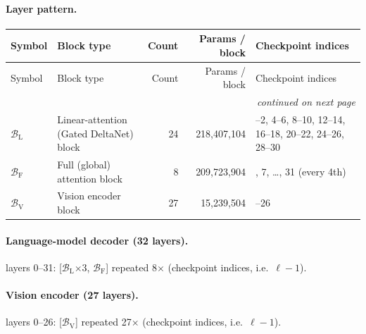 \documentclass[10pt,a4paper]{article}
\theoremstyle{definition}
\begin{document}
\paragraph{Layer pattern.}
\begin{longtable}{l>{\raggedright\arraybackslash}p{5.6cm}rr>{\raggedright\arraybackslash}p{4.4cm}}
\toprule
Symbol & Block type & Count & Params / block & Checkpoint indices \\
\midrule
\endfirsthead
\toprule
Symbol & Block type & Count & Params / block & Checkpoint indices \\
\midrule
\endhead
\midrule \multicolumn{5}{r}{\textit{continued on next page}} \\
\endfoot
\bottomrule
\endlastfoot
$\mathcal{B}_{\mathrm{L}}$ & Linear-attention (Gated DeltaNet) block & 24 & 218,407,104 & 0--2, 4--6, 8--10, 12--14, 16--18, 20--22, 24--26, 28--30 \\
$\mathcal{B}_{\mathrm{F}}$ & Full (global) attention block & 8 & 209,723,904 & 3, 7, \ldots, 31 (every 4th) \\
$\mathcal{B}_{\mathrm{V}}$ & Vision encoder block & 27 & 15,239,504 & 0--26 \\
\end{longtable}
\paragraph{Language-model decoder (32 layers).} 
layers 0--31: [$\mathcal{B}_{\mathrm{L}}$$\times3$, $\mathcal{B}_{\mathrm{F}}$] repeated 8$\times$ (checkpoint indices, i.e.\ $\ell-1$).
\paragraph{Vision encoder (27 layers).} 
layers 0--26: [$\mathcal{B}_{\mathrm{V}}$] repeated 27$\times$ (checkpoint indices, i.e.\ $\ell-1$).
\end{document}
